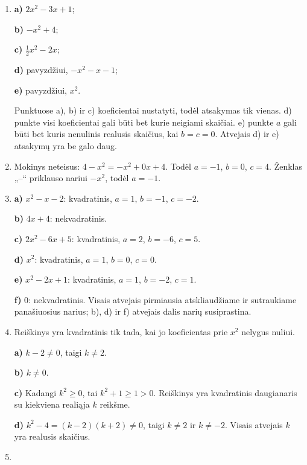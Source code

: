 \documentclass[12pt,a4paper]{exam}
\begin{document}
\begin{enumerate}
\textbf{b)} $a=-1$, $b=4$, $c=0$.

\textbf{c)} $a=-2$, $b=0$, $c=5$.

\textbf{d)} $a=1$, $b=0$, $c=0$.

\textbf{e)} $a=-1$, $b=1$, $c=-3$.

\textbf{f)} $a=\frac{1}{2}$, $b=-\frac{3}{4}$, $c=0$.
\item

\textbf{a)} $2x^2-3x+1$;

\textbf{b)} $-x^2+4$;

\textbf{c)} $\frac{1}{2}x^2-2x$;

\textbf{d)} pavyzdžiui, $-x^2-x-1$;

\textbf{e)} pavyzdžiui, $x^2$.

Punktuose a), b) ir c) koeficientai nustatyti, todėl atsakymas tik vienas. d) punkte visi koeficientai gali būti bet kurie neigiami skaičiai. e) punkte $a$ gali būti bet kuris nenulinis realusis skaičius, kai $b=c=0$. Atvejais d) ir e) atsakymų yra be galo daug.
\item Mokinys neteisus: $4-x^2=-x^2+0x+4$. Todėl $a=-1$, $b=0$, $c=4$. Ženklas „–“ priklauso nariui $-x^2$, todėl $a=-1$.
\item

\textbf{a)} $x^2-x-2$: kvadratinis, $a=1$, $b=-1$, $c=-2$.

\textbf{b)} $4x+4$: nekvadratinis.

\textbf{c)} $2x^2-6x+5$: kvadratinis, $a=2$, $b=-6$, $c=5$.

\textbf{d)} $x^2$: kvadratinis, $a=1$, $b=0$, $c=0$.

\textbf{e)} $x^2-2x+1$: kvadratinis, $a=1$, $b=-2$, $c=1$.

\textbf{f)} $0$: nekvadratinis. Visais atvejais pirmiausia atskliaudžiame ir sutraukiame panašiuosius narius; b), d) ir f) atvejais dalis narių susiprastina.
\item Reiškinys yra kvadratinis tik tada, kai jo koeficientas prie $x^2$ nelygus nuliui.

\textbf{a)} $k-2\ne0$, taigi $k\ne2$.

\textbf{b)} $k\ne0$.

\textbf{c)} Kadangi $k^2\geq0$, tai $k^2+1\geq1>0$. Reiškinys yra kvadratinis daugianaris su kiekviena realiąja $k$ reikšme.

\textbf{d)} $k^2-4=(k-2)(k+2)\ne0$, taigi $k\ne2$ ir $k\ne-2$. Visais atvejais $k$ yra realusis skaičius.
\item


\end{enumerate}
\end{document}

